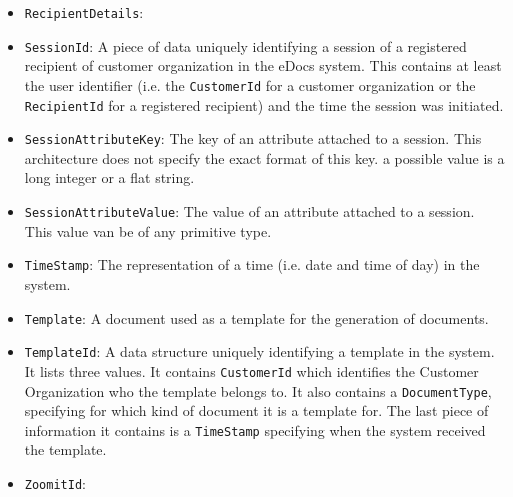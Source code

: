 \documentclass[a4paper,10pt]{article}
\begin{document}
\begin{itemize}
    \item \texttt{RecipientDetails}:
    
    \item \texttt{SessionId}: A piece of data uniquely identifying a session of a registered recipient of customer organization in the eDocs system. This contains at least the user identifier (i.e. the \texttt{CustomerId} for a customer organization or the \texttt{RecipientId} for a registered recipient) and the time the session was initiated.
    
    \item \texttt{SessionAttributeKey}: The key of an attribute attached to a session. This architecture does not specify the exact format of this key. a possible value is a long integer or a flat string.
    
    \item \texttt{SessionAttributeValue}: The value of an attribute attached to a session. This value van be of any primitive type.
    
    \item \texttt{TimeStamp}: The representation of a time (i.e. date and time of day) in the system.
    
    \item \texttt{Template}: A document used as a template for the generation of documents.
    
    \item \texttt{TemplateId}: A data structure uniquely identifying a template in the system. It lists three values. It contains \texttt{CustomerId} which identifies the Customer Organization who the template belongs to. It also contains a \texttt{DocumentType}, specifying for which kind of document it is a template for. The last piece of information it contains is a \texttt{TimeStamp} specifying when the system received the template.
    
    \item \texttt{ZoomitId}:
\end{itemize}
\end{document}
